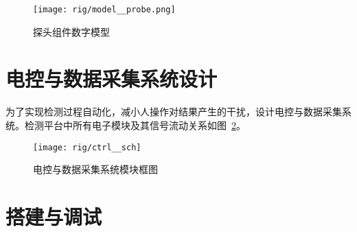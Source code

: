
\begin{figure}[tbhp]
\centering
\texttt{[image: rig/model\_\_probe.png]}
\caption{探头组件数字模型}
\label{fig:rig-model-probe}
\end{figure}



\clearpage



\section{电控与数据采集系统设计}\label{sec:rig-ctrl}

为了实现检测过程自动化，减小人操作对结果产生的干扰，设计电控与数据采集系统。检测平台中所有电子模块及其信号流动关系如图~\ref{fig:rig-ctrl-sch}。

\begin{figure}[tbhp]
\centering
\texttt{[image: rig/ctrl\_\_sch]}
\caption[电控系统框图]{电控与数据采集系统模块框图}
\label{fig:rig-ctrl-sch}
\end{figure}




\section{搭建与调试}\label{sec:rig-build}



